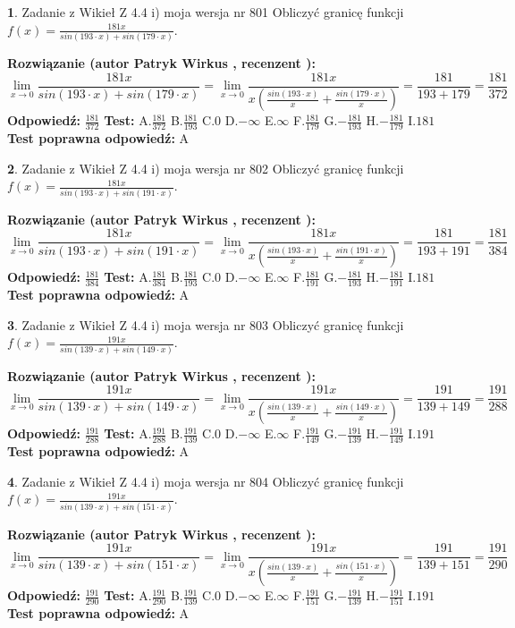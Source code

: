 \documentclass[12pt, a4paper]{article}
\theoremstyle{definition} %
\newtheorem{zad}{}
\newcommand{\zadStart}[1]{\begin{zad}#1\newline}
\newcommand{\zadStop}{\end{zad}}
\newcommand{\rozwStart}[2]{\noindent \textbf{Rozwiązanie (autor #1 , recenzent #2): }\newline}
\newcommand{\rozwStop}{\newline}
\newcommand{\odpStart}{\noindent \textbf{Odpowiedź:}\newline}
\newcommand{\odpStop}{\newline}
\newcommand{\testStart}{\noindent \textbf{Test:}\newline}
\newcommand{\testStop}{\newline}
\newcommand{\kluczStart}{\noindent \textbf{Test poprawna odpowiedź:}\newline}
\newcommand{\kluczStop}{\newline}
\begin{document}
\zadStart{Zadanie z Wikieł Z 4.4 i) moja wersja nr 801}
Obliczyć granicę funkcji $f(x)=\frac{181x}{sin(193\cdot x) +sin(179\cdot x)}$.
\zadStop
\rozwStart{Patryk Wirkus}{}
$$\lim\limits_{x\to 0}\frac{181x}{sin(193\cdot x) +sin(179\cdot x)}=\lim\limits_{x\to 0}\frac{181x}{x(\frac{sin(193\cdot x)}{x}+\frac{sin(179\cdot x)}{x})}=\frac{181}{193+179} = \frac{181}{372}$$
\rozwStop
\odpStart
$\frac{181}{372}$
\odpStop
\testStart
A.$\frac{181}{372}$
B.$\frac{181}{193}$
C.$0$
D.$-\infty$
E.$\infty$
F.$\frac{181}{179}$
G.$-\frac{181}{193}$
H.$-\frac{181}{179}$
I.$181$
\testStop
\kluczStart
A
\kluczStop



\zadStart{Zadanie z Wikieł Z 4.4 i) moja wersja nr 802}
Obliczyć granicę funkcji $f(x)=\frac{181x}{sin(193\cdot x) +sin(191\cdot x)}$.
\zadStop
\rozwStart{Patryk Wirkus}{}
$$\lim\limits_{x\to 0}\frac{181x}{sin(193\cdot x) +sin(191\cdot x)}=\lim\limits_{x\to 0}\frac{181x}{x(\frac{sin(193\cdot x)}{x}+\frac{sin(191\cdot x)}{x})}=\frac{181}{193+191} = \frac{181}{384}$$
\rozwStop
\odpStart
$\frac{181}{384}$
\odpStop
\testStart
A.$\frac{181}{384}$
B.$\frac{181}{193}$
C.$0$
D.$-\infty$
E.$\infty$
F.$\frac{181}{191}$
G.$-\frac{181}{193}$
H.$-\frac{181}{191}$
I.$181$
\testStop
\kluczStart
A
\kluczStop



\zadStart{Zadanie z Wikieł Z 4.4 i) moja wersja nr 803}
Obliczyć granicę funkcji $f(x)=\frac{191x}{sin(139\cdot x) +sin(149\cdot x)}$.
\zadStop
\rozwStart{Patryk Wirkus}{}
$$\lim\limits_{x\to 0}\frac{191x}{sin(139\cdot x) +sin(149\cdot x)}=\lim\limits_{x\to 0}\frac{191x}{x(\frac{sin(139\cdot x)}{x}+\frac{sin(149\cdot x)}{x})}=\frac{191}{139+149} = \frac{191}{288}$$
\rozwStop
\odpStart
$\frac{191}{288}$
\odpStop
\testStart
A.$\frac{191}{288}$
B.$\frac{191}{139}$
C.$0$
D.$-\infty$
E.$\infty$
F.$\frac{191}{149}$
G.$-\frac{191}{139}$
H.$-\frac{191}{149}$
I.$191$
\testStop
\kluczStart
A
\kluczStop



\zadStart{Zadanie z Wikieł Z 4.4 i) moja wersja nr 804}
Obliczyć granicę funkcji $f(x)=\frac{191x}{sin(139\cdot x) +sin(151\cdot x)}$.
\zadStop
\rozwStart{Patryk Wirkus}{}
$$\lim\limits_{x\to 0}\frac{191x}{sin(139\cdot x) +sin(151\cdot x)}=\lim\limits_{x\to 0}\frac{191x}{x(\frac{sin(139\cdot x)}{x}+\frac{sin(151\cdot x)}{x})}=\frac{191}{139+151} = \frac{191}{290}$$
\rozwStop
\odpStart
$\frac{191}{290}$
\odpStop
\testStart
A.$\frac{191}{290}$
B.$\frac{191}{139}$
C.$0$
D.$-\infty$
E.$\infty$
F.$\frac{191}{151}$
G.$-\frac{191}{139}$
H.$-\frac{191}{151}$
I.$191$
\testStop
\kluczStart
A
\kluczStop
\end{document}
